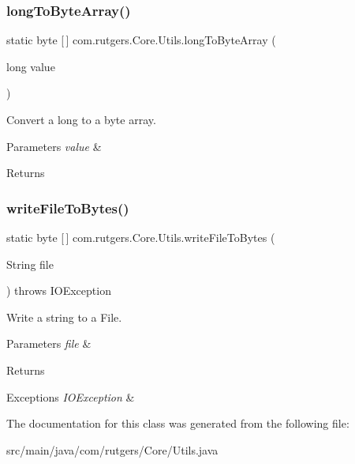 \subsubsection{\texorpdfstring{long\+To\+Byte\+Array()}{longToByteArray()}}
{\footnotesize\ttfamily static byte \mbox{[}$\,$\mbox{]} com.\+rutgers.\+Core.\+Utils.\+long\+To\+Byte\+Array (\begin{DoxyParamCaption}\item[{long}]{value }\end{DoxyParamCaption})\hspace{0.3cm}{\ttfamily [static]}}

Convert a long to a byte array. 
\begin{DoxyParams}{Parameters}
{\em value} & \\
\hline
\end{DoxyParams}
\begin{DoxyReturn}{Returns}

\end{DoxyReturn}
\mbox{\label{classcom_1_1rutgers_1_1Core_1_1Utils_a56a1cd6f67c4f6387826bf38adf6e82f}} 
\subsubsection{\texorpdfstring{write\+File\+To\+Bytes()}{writeFileToBytes()}}
{\footnotesize\ttfamily static byte \mbox{[}$\,$\mbox{]} com.\+rutgers.\+Core.\+Utils.\+write\+File\+To\+Bytes (\begin{DoxyParamCaption}\item[{String}]{file }\end{DoxyParamCaption}) throws I\+O\+Exception\hspace{0.3cm}{\ttfamily [static]}}

Write a string to a File. 
\begin{DoxyParams}{Parameters}
{\em file} & \\
\hline
\end{DoxyParams}
\begin{DoxyReturn}{Returns}

\end{DoxyReturn}

\begin{DoxyExceptions}{Exceptions}
{\em I\+O\+Exception} & \\
\hline
\end{DoxyExceptions}


The documentation for this class was generated from the following file\+:\begin{DoxyCompactItemize}
\item 
src/main/java/com/rutgers/\+Core/Utils.\+java\end{DoxyCompactItemize}
